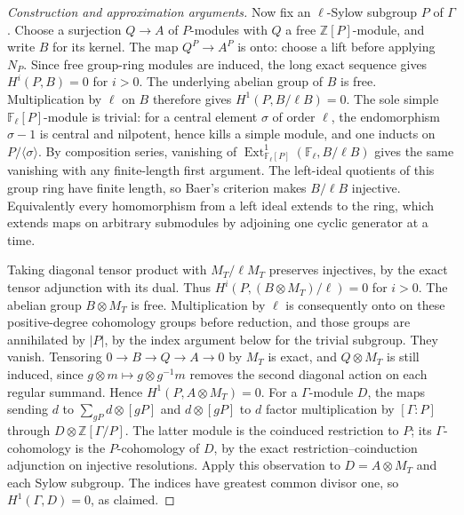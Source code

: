 \documentclass[11pt,a4paper,openany,oneside]{book}
\theoremstyle{resultstyle}
\theoremstyle{definition}
\numberwithin{equation}{chapter}
\begin{document}
\begin{proof}[Construction and approximation arguments]
Now fix an \(\ell\)-Sylow subgroup \(P\) of \(\Gamma\).
Choose a surjection \(Q\to A\) of \(P\)-modules with \(Q\)
a free \(\mathbb Z[P]\)-module, and write \(B\) for its
kernel. The map \(Q^P\to A^P\) is onto: choose a lift
before applying \(N_P\). Since free group-ring modules
are induced, the long exact sequence gives
\(H^i(P,B)=0\) for \(i>0\). The underlying abelian group
of \(B\) is free. Multiplication by \(\ell\) on \(B\)
therefore gives \(H^1(P,B/\ell B)=0\). The sole simple
\(\mathbb F_\ell[P]\)-module is trivial: for a central
element \(\sigma\) of order \(\ell\), the endomorphism
\(\sigma-1\) is central and nilpotent, hence kills a
simple module, and one inducts on \(P/\langle\sigma\rangle\).
By composition series, vanishing of
\(\operatorname{Ext}^1_{\mathbb F_\ell[P]}(\mathbb F_\ell,B/\ell B)\)
gives the same vanishing with any finite-length first
argument. The left-ideal quotients of this group ring
have finite length, so Baer's criterion makes \(B/\ell B\)
injective. Equivalently every homomorphism from a left
ideal extends to the ring, which extends maps on arbitrary
submodules by adjoining one cyclic generator at a time.

Taking diagonal tensor product with
\(M_T/\ell M_T\) preserves injectives, by the exact tensor
adjunction with its dual. Thus
\(H^i(P,(B\otimes M_T)/\ell)=0\) for \(i>0\).
The abelian group \(B\otimes M_T\) is free. Multiplication
by \(\ell\) is consequently onto on these positive-degree
cohomology groups before reduction, and those groups are
annihilated by \(|P|\), by the index argument below for the
trivial subgroup. They vanish. Tensoring
\(0\to B\to Q\to A\to0\) by \(M_T\) is exact, and
\(Q\otimes M_T\) is still induced, since
\(g\otimes m\mapsto g\otimes g^{-1}m\)
removes the second diagonal action on each regular summand.
Hence \(H^1(P,A\otimes M_T)=0\).
For a \(\Gamma\)-module \(D\), the maps sending \(d\) to
\(\sum_{gP}d\otimes[gP]\) and \(d\otimes[gP]\) to \(d\)
factor multiplication by \([\Gamma:P]\) through
\(D\otimes\mathbb Z[\Gamma/P]\). The latter module is the
coinduced restriction to \(P\); its \(\Gamma\)-cohomology
is the \(P\)-cohomology of \(D\), by the exact
restriction--coinduction adjunction on injective resolutions.
Apply this observation to \(D=A\otimes M_T\) and each
Sylow subgroup. The indices have greatest common divisor
one, so \(H^1(\Gamma,D)=0\), as claimed.


\end{proof}
\end{document}
